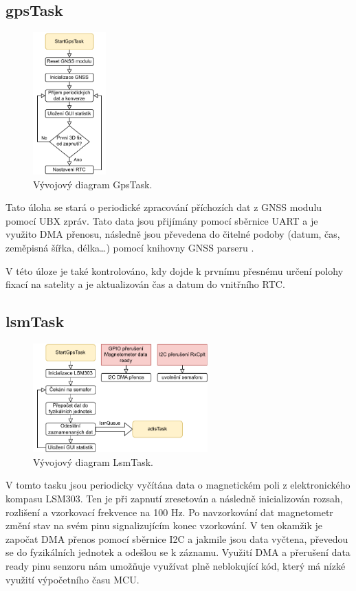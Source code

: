 \subsection{gpsTask}
\begin{figure}[h]
    \centering
    \includegraphics[width=0.25\textwidth]{obrazky/GpsTask}
    \caption{Vývojový diagram GpsTask.}
\end{figure}
Tato úloha se stará o periodické zpracování příchozích dat z GNSS modulu pomocí \ac{UBX} zpráv. Tato data jsou přijímány pomocí sběrnice \ac{UART} a je využito DMA přenosu, následně jsou převedena do čitelné podoby (datum, čas, zeměpisná šířka, délka\ldots) pomocí knihovny GNSS parseru \cite{SimpleMethod2021}.

V této úloze je také kontrolováno, kdy dojde k prvnímu přesnému určení polohy fixací na satelity a je aktualizován čas a datum do vnitřního \ac{RTC}.

\subsection{lsmTask} \label{lsmTask}
\begin{figure}[h]
    \centering
    \includegraphics[width=0.6\textwidth]{obrazky/LsmTask}
    \caption{Vývojový diagram LsmTask.}
\end{figure}
V tomto tasku jsou periodicky vyčítána data o magnetickém poli z elektronického kompasu LSM303. Ten je při zapnutí zresetován a následně inicializován rozsah, rozlišení a vzorkovací frekvence na 100 Hz. Po navzorkování dat magnetometr změní stav na svém pinu signalizujícím konec vzorkování. V ten okamžik je započat DMA přenos pomocí sběrnice I2C a jakmile jsou data vyčtena, převedou se do fyzikálních jednotek a odešlou se k záznamu. Využití DMA a přerušení data ready pinu senzoru nám umožňuje využívat plně neblokující kód, který má nízké využití výpočetního času MCU.


